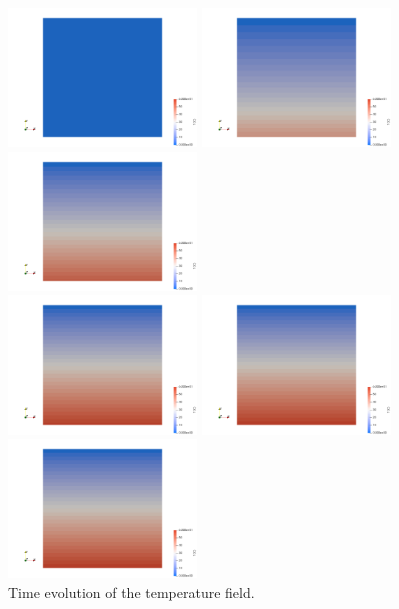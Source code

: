 \begin{center}
\includegraphics[width=5cm]{python_codes/fieldstone_141/results/test2/T0000}
\includegraphics[width=5cm]{python_codes/fieldstone_141/results/test2/T0500}
\includegraphics[width=5cm]{python_codes/fieldstone_141/results/test2/T1000}\\
\includegraphics[width=5cm]{python_codes/fieldstone_141/results/test2/T2000}
\includegraphics[width=5cm]{python_codes/fieldstone_141/results/test2/T3000}
\includegraphics[width=5cm]{python_codes/fieldstone_141/results/test2/T4000}\\
{\captionfont Time evolution of the temperature field.}
\end{center}

